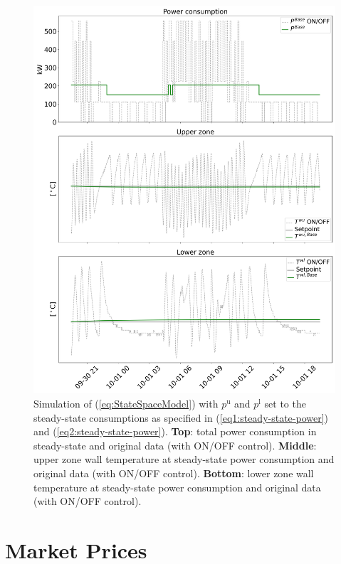 \documentclass[sigconf]{acmart}
\begin{document}
\begin{figure}[t]
    \centering
    \includegraphics[width=\columnwidth]{figures/4thOrderModelVisualizationSteadyState.png}
    \caption{Simulation of (\ref{eq:StateSpaceModel}) with $p^{\text{u}}$ and $p^{\text{l}}$ set to the steady-state consumptions as specified in (\ref{eq1:steady-state-power}) and (\ref{eq2:steady-state-power}). \textbf{Top}: total power consumption in steady-state and original data (with ON/OFF control). \textbf{Middle}: upper zone wall temperature at steady-state power consumption and original data (with ON/OFF control). \textbf{Bottom}: lower zone wall temperature at steady-state power consumption and original data (with ON/OFF control).}
    \label{fig:4thOrderModelVisualizationSteadyState}
\end{figure}

\section{Market Prices}\label{app:market-prices}
\end{document}
